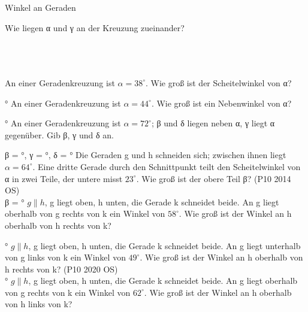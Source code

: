 \begin{aufgabe}{Winkel an Geraden}
\begin{teile}
\teil Wie liegen α und γ an der Kreuzung zueinander? \\  \\  \\  \\ 

\teil An einer Geradenkreuzung ist $\alpha = 38^\circ$. Wie groß ist der Scheitelwinkel von α?

\leerfeld °
\teil An einer Geradenkreuzung ist $\alpha = 44^\circ$. Wie groß ist ein Nebenwinkel von α?

\leerfeld °
\teil An einer Geradenkreuzung ist $\alpha = 72^\circ$; β und δ liegen neben α, γ liegt α gegenüber. Gib β, γ und δ an.

β = \leerfeld °, γ = \leerfeld °, δ = \leerfeld °
\teil Die Geraden g und h schneiden sich; zwischen ihnen liegt $\alpha = 64^\circ$. Eine dritte Gerade durch den Schnittpunkt teilt den Scheitelwinkel von α in zwei Teile, der untere misst $23^\circ$. Wie groß ist der obere Teil β? \hfill (P10 2014 OS) \\ β = \leerfeld °
\teil $g \parallel h$, g liegt oben, h unten, die Gerade k schneidet beide. An g liegt oberhalb von g rechts von k ein Winkel von $58^\circ$. Wie groß ist der Winkel an h oberhalb von h rechts von k?

\leerfeld °
\teil $g \parallel h$, g liegt oben, h unten, die Gerade k schneidet beide. An g liegt unterhalb von g links von k ein Winkel von $49^\circ$. Wie groß ist der Winkel an h oberhalb von h rechts von k? \hfill (P10 2020 OS) \\

\leerfeld °
\teil $g \parallel h$, g liegt oben, h unten, die Gerade k schneidet beide. An g liegt oberhalb von g rechts von k ein Winkel von $62^\circ$. Wie groß ist der Winkel an h oberhalb von h links von k?


\end{teile}
\end{aufgabe}
